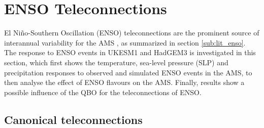 \section{ENSO Teleconnections}\label{sq:enso1}





El Ni\~no-Southern Oscillation (ENSO) teleconnections are the prominent source of interannual variability for the AMS \citep{vera2006}, as summarized in section \ref{sub:lit_enso}.
The response to ENSO events in UKESM1 and HadGEM3 is investigated in this section, which first shows the temperature, sea-level pressure (SLP) and precipitation responses  to observed and simulated ENSO events in the AMS, to then analyse the effect of ENSO flavours on the AMS. Finally, results show a possible influence of the QBO for the teleconnections of ENSO. 




\subsection{Canonical teleconnections}

